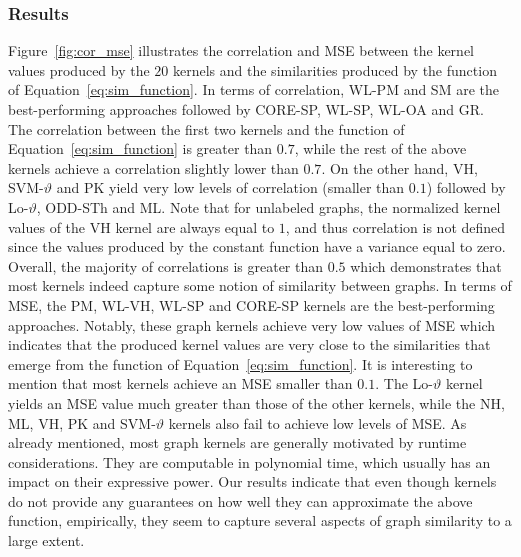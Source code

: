 \documentclass[twoside,11pt]{article}
\begin{document}
\subsubsection{Results}
Figure~\ref{fig:cor_mse} illustrates the correlation and MSE between the kernel values produced by the $20$ kernels and the similarities produced by the function of Equation~\eqref{eq:sim_function}.
In terms of correlation, WL-PM and SM are the best-performing approaches followed by CORE-SP, WL-SP, WL-OA and GR.
The correlation between the first two kernels and the function of Equation~\eqref{eq:sim_function} is greater than $0.7$, while the rest of the above kernels achieve a correlation slightly lower than $0.7$.
On the other hand, VH, SVM-$\vartheta$ and PK yield very low levels of correlation (smaller than $0.1$) followed by Lo-$\vartheta$, ODD-STh and ML.
Note that for unlabeled graphs, the normalized kernel values of the VH kernel are always equal to $1$, and thus correlation is not defined since the values produced by the constant function have a variance equal to zero.
Overall, the majority of correlations is greater than $0.5$ which demonstrates that most kernels indeed capture some notion of similarity between graphs.
In terms of MSE, the PM, WL-VH, WL-SP and CORE-SP kernels are the best-performing approaches.
Notably, these graph kernels achieve very low values of MSE which indicates that the produced kernel values are very close to the similarities that emerge from the function of Equation~\ref{eq:sim_function}.
It is interesting to mention that most kernels achieve an MSE smaller than $0.1$.
The Lo-$\vartheta$ kernel yields an MSE value much greater than those of the other kernels, while the NH, ML, VH, PK and SVM-$\vartheta$ kernels also fail to achieve low levels of MSE.
As already mentioned, most graph kernels are generally motivated by runtime considerations.
They are computable in polynomial time, which usually has an impact on their expressive power.
Our results indicate that even though kernels do not provide any guarantees on how well they can approximate the above function, empirically, they seem to capture several aspects of graph similarity to a large extent. 
\end{document}
